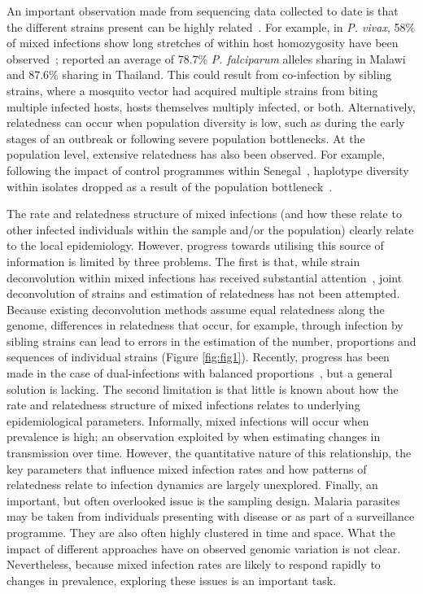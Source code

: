 \documentclass[9pt,lineno]{elife}
\begin{document}
An important observation made from sequencing data collected to date is that the different strains present can be highly related~\citep{Nair2014, Trevino2017}.  For example, in {\it P. vivax}, 58\% of mixed infections show long stretches of within host homozygosity have been observed~\citep{Pearson2016}; \citet{Nkhoma2012} reported an average of 78.7\% {\it P. falciparum} alleles sharing in Malawi and 87.6\% sharing in Thailand. This could result from co-infection by sibling strains, where a mosquito vector had acquired multiple strains from biting multiple infected hosts, hosts themselves multiply infected, or both.  Alternatively, relatedness can occur when population diversity is low, such as during the early stages of an outbreak or following severe population bottlenecks.  At the population level, extensive relatedness has also been observed.  For example, following the impact of control programmes within Senegal~\citep{Mouzin2010}, haplotype diversity within isolates dropped as a result of the population bottleneck~\citep{Wong2017}.

The rate and relatedness structure of mixed infections (and how these relate to other infected individuals within the sample and/or the population) clearly relate to the local epidemiology.  However, progress towards utilising this source of information is limited by three problems.  The first is that, while strain deconvolution within mixed infections has received substantial attention~\citep{Galinsky2015, Jack2016, Chang2017}, joint deconvolution of strains and estimation of relatedness has not been attempted.  Because existing deconvolution methods assume equal relatedness along the genome, differences in relatedness that occur, for example, through infection by sibling strains can lead to errors in the estimation of the number, proportions and sequences of individual strains (Figure \ref{fig:fig1}).  Recently, progress has been made in the case of dual-infections with balanced proportions~\citep{Henden2016}, but a general solution is lacking.  The second limitation is that little is known about how the rate and relatedness structure of mixed infections relates to underlying epidemiological parameters.  Informally, mixed infections will occur when prevalence is high; an observation exploited by \citet{Cerqueira2017} when estimating changes in transmission over time.  However, the quantitative nature of this relationship, the key parameters that influence mixed infection rates and how patterns of relatedness relate to infection dynamics are largely unexplored.  Finally, an important, but often overlooked issue is the sampling design.  Malaria parasites may be taken from individuals presenting with disease or as part of a surveillance programme.  They are also often highly clustered in time and space.  What the impact of different approaches have on observed genomic variation is not clear.  Nevertheless, because mixed infection rates are likely to respond rapidly to changes in prevalence, exploring these issues is an important task.
\end{document}
